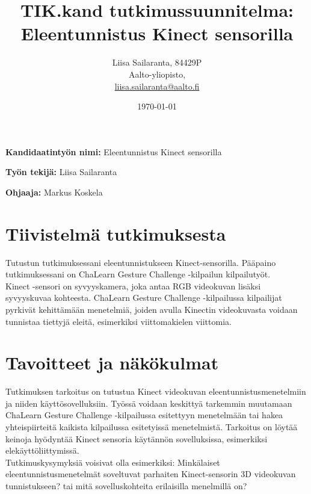 \documentclass[12pt,a4paper,finnish,oneside]{article}
\begin{document}

\title{TIK.kand tutkimussuunnitelma:\\[5mm]
Eleentunnistus Kinect sensorilla}

\author{Liisa Sailaranta, 84429P\\
Aalto-yliopisto,\\
\url{liisa.sailaranta@aalto.fi}}

\date{\today}

\maketitle




\vspace{10mm}

%

\textbf{Kandidaatintyön nimi:} Eleentunnistus Kinect sensorilla

\textbf{Työn tekijä:} Liisa Sailaranta

\textbf{Ohjaaja:} Markus Koskela


\section{Tiivistelmä tutkimuksesta}

Tutustun tutkimuksessani eleentunnistukseen Kinect-sensorilla. Pääpaino tutkimuksessani on ChaLearn Gesture Challenge -kilpailun kilpailutyöt.\\
Kinect -sensori on syvyyskamera, joka antaa RGB videokuvan lisäksi syvyyskuvaa kohteesta. ChaLearn Gesture Challenge -kilpailussa kilpailijat pyrkivät kehittämään menetelmiä, joiden avulla Kinectin videokuvasta voidaan tunnistaa tiettyjä eleitä, esimerkiksi viittomakielen viittomia. 

\section{Tavoitteet ja näkökulmat}

Tutkimuksen tarkoitus on tutustua Kinect videokuvan eleentunnistusmenetelmiin ja niiden käyttösovelluksiin. Työssä voidaan keskittyä tarkemmin muutamaan ChaLearn Gesture Challenge -kilpailussa esitettyyn menetelmään tai hakea yhteispiirteitä kaikista kilpailussa esitetyissä menetelmistä. Tarkoitus on löytää keinoja hyödyntää Kinect sensoria käytännön sovelluksissa, esimerkiksi elekäyttöliittymissä.\\ Tutkimuskysymyksiä voisivat olla esimerkiksi: Minkälaiset eleentunnistusmenetelmät soveltuvat parhaiten Kinect-sensorin 3D videokuvan tunnistukseen? tai mitä sovelluskohteita erilaisilla menelmillä on?
\end{document}
